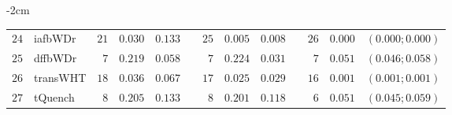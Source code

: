 \begin{table*}[!htbp]
\begin{adjustwidth*}{}{-2cm}
\begin{tabular}{@{}rlrrrrrrrrrcc@{}}
\footnotesize{$24$} & \footnotesize{iafbWDr  } & \footnotesize{$21$} & \footnotesize{$0.030$} & \footnotesize{$0.133$} && \footnotesize{$25$} & \footnotesize{$0.005$} & \footnotesize{$0.008$} && \footnotesize{$26$} & \footnotesize{$0.000$} & \footnotesize{$(0.000;0.000)$} \\
\footnotesize{$25$} & \footnotesize{dffbWDr  } & \footnotesize{$7 $} & \footnotesize{$0.219$} & \footnotesize{$0.058$} && \footnotesize{$7 $} & \footnotesize{$0.224$} & \footnotesize{$0.031$} && \footnotesize{$7 $} & \footnotesize{$0.051$} & \footnotesize{$(0.046;0.058)$} \\
\footnotesize{$26$} & \footnotesize{transWHT } & \footnotesize{$18$} & \footnotesize{$0.036$} & \footnotesize{$0.067$} && \footnotesize{$17$} & \footnotesize{$0.025$} & \footnotesize{$0.029$} && \footnotesize{$16$} & \footnotesize{$0.001$} & \footnotesize{$(0.001;0.001)$} \\
\footnotesize{$27$} & \footnotesize{tQuench  } & \footnotesize{$8 $} & \footnotesize{$0.205$} & \footnotesize{$0.133$} && \footnotesize{$8 $} & \footnotesize{$0.201$} & \footnotesize{$0.118$} && \footnotesize{$6 $} & \footnotesize{$0.051$} & \footnotesize{$(0.045;0.059)$} \\
\bottomrule
\end{tabular}
\end{adjustwidth*}
\end{table*}

